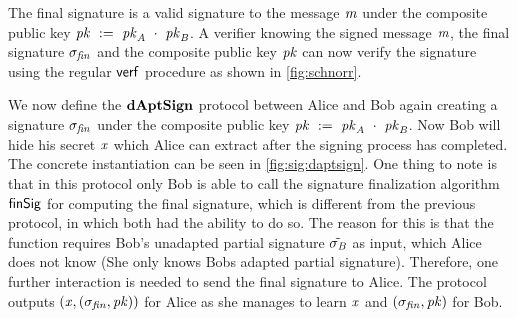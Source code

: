 The final signature is a valid signature to the message $\mathit{m}$ under the composite public key $\mathit{pk} ~:=~ \mathit{pk}_{\mathit{A}} ~\cdot~ \mathit{pk}_{\mathit{B}}$.
A verifier knowing the signed message $\mathit{m}$, the final signature $\sigma_{\mathit{fin}}$ and the composite public key $\mathit{pk}$ can now verify the signature using the regular $\mathsf{verf}$ procedure as shown in \cref{fig:schnorr}.

We now define the $\mathbf{dAptSign}$ protocol between Alice and Bob again creating a signature $\sigma_{\mathit{fin}}$ under the composite public key $\mathit{pk} ~:=~ \mathit{pk}_{\mathit{A}} ~\cdot~ \mathit{pk}_{\mathit{B}}$.
Now Bob will hide his secret $\mathit{x}$ which Alice can extract after the signing process has completed.
The concrete instantiation can be seen in \cref{fig:sig:daptsign}.
One thing to note is that in this protocol only Bob is able to call the signature finalization algorithm $\mathsf{finSig}$ for computing the final signature, which is different from the previous protocol, in which both had the ability to do so.
The reason for this is that the function requires Bob's unadapted partial signature $\tilde{\sigma_{\mathit{B}}}$ as input, which Alice does not know (She only knows Bobs adapted partial signature).
Therefore, one further interaction is needed to send the final signature to Alice.
The protocol outputs $(\mathit{x}, (\sigma_{\mathit{fin}}, \mathit{pk}))$ for Alice as she manages to learn $\mathit{x}$ and $(\sigma_{\mathit{fin}}, \mathit{pk})$ for Bob.

